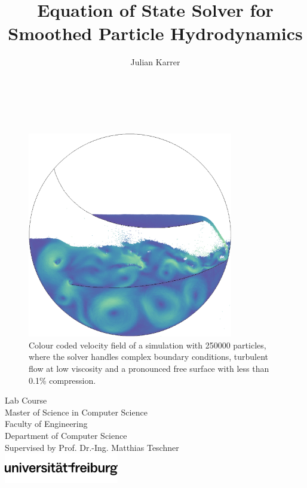 \documentclass[oneside, a4paper]{book}
\title{Equation of State Solver for Smoothed Particle Hydrodynamics}
\author{Julian Karrer}
\begin{document}
\begin{titlepage}
  \pagestyle{empty}
  \begin{center}
    \Huge\textbf{\@title}\\
    \vspace{0.5cm}
    \Large{\@author}\\
    \vfill
    \begin{figure}[h!]
      \centering
      \includegraphics*[width=0.8\textwidth]{images/title/titleimage.jpg}
      \caption{Colour coded velocity field of a simulation with 250000 particles, where the solver handles
        complex boundary conditions, turbulent flow at low viscosity and a pronounced free surface with less than
        0.1\% compression. \cite{ray-optics-book}}
      \label{fig:title-image}
    \end{figure}
    \vfill
    \Large
    Lab Course\\
    Master of Science in Computer Science\\
    \vspace{0.5cm}
    \large
    Faculty of Engineering\\
    Department of Computer Science\\
    Supervised by Prof. Dr.-Ing. Matthias Teschner\\
    \vspace{0.5cm}
    \includegraphics*[width=5cm]{images/title/ufr-logo.png}
  \end{center}
\end{titlepage}
\captionsetup[figure]{font=normalsize,labelfont=normalsize}
\end{document}
